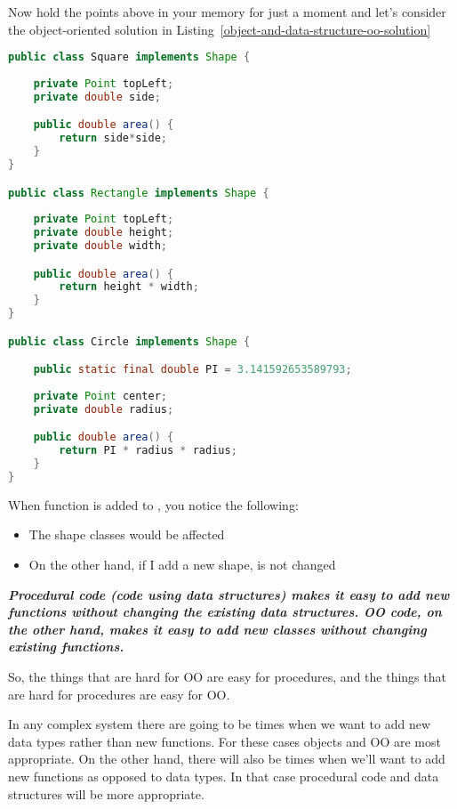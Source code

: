 Now hold the points above in your memory for just a moment and let's consider the object-oriented solution in Listing~\ref{object-and-data-structure-oo-solution} 

\begin{tcolorbox}[breakable, colback=green!10!white, colframe=green!85!black, label = object-and-data-structure-oo-solution]
\begin{lstlisting}[language = java, basicstyle=\small]
public class Square implements Shape {
    
    private Point topLeft;
    private double side;

    public double area() {
        return side*side;
    }
}

public class Rectangle implements Shape {
    
    private Point topLeft;
    private double height;
    private double width;

    public double area() {
        return height * width;
    }
}

public class Circle implements Shape {

    public static final double PI = 3.141592653589793;
    
    private Point center;
    private double radius;

    public double area() {
        return PI * radius * radius;
    }
}
\end{lstlisting}
\end{tcolorbox}

When  function is added to , you notice the following:

\begin{itemize}
    \item The shape classes would be affected
    \item On the other hand, if I add a new shape,   is not changed
\end{itemize}

\textit{\textbf{Procedural code (code using data structures) makes it easy to add new functions without changing the existing data structures. OO code, on the other hand, makes it easy to add new classes without changing existing functions.}}

So, the things that are hard for OO are easy for procedures, and the things that are hard for procedures are easy for OO.

In any complex system there are going to be times when we want to add new data
types rather than new functions. For these cases objects and OO are most appropriate. On the other hand, there will also be times when we’ll want to add new functions as opposed to data types. In that case procedural code and data structures will be more appropriate.


